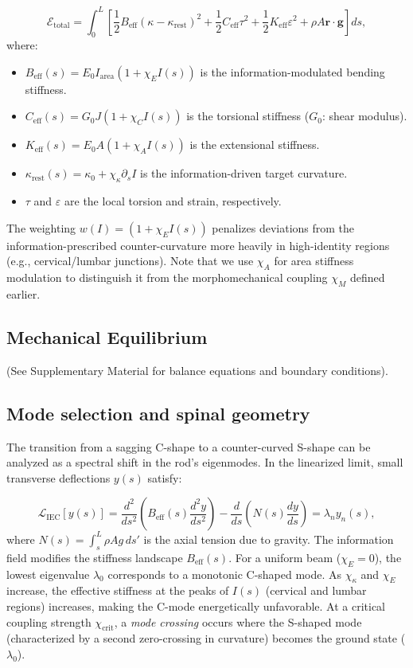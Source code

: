\documentclass[11pt,a4paper]{article}
\begin{document}
\begin{equation}
\mathcal{E}_{\mathrm{total}} = \int_0^L \left[ \frac{1}{2} B_{\mathrm{eff}}(\kappa - \kappa_{\mathrm{rest}})^2 + \frac{1}{2} C_{\mathrm{eff}} \tau^2 + \frac{1}{2} K_{\mathrm{eff}} \varepsilon^2 + \rho A \mathbf{r} \cdot \mathbf{g} \right] ds,
\label{eq:iec_energy}
\end{equation}
where:
\begin{itemize}
    \item $B_{\mathrm{eff}}(s) = E_0 I_{\mathrm{area}} (1 + \chi_E I(s))$ is the information-modulated bending stiffness.
    \item $C_{\mathrm{eff}}(s) = G_0 J (1 + \chi_C I(s))$ is the torsional stiffness ($G_0$: shear modulus).
    \item $K_{\mathrm{eff}}(s) = E_0 A (1 + \chi_A I(s))$ is the extensional stiffness.
    \item $\kappa_{\mathrm{rest}}(s) = \kappa_0 + \chi_\kappa \partial_s I$ is the information-driven target curvature.
    \item $\tau$ and $\varepsilon$ are the local torsion and strain, respectively.
\end{itemize}
The weighting $w(I) = (1 + \chi_E I(s))$ penalizes deviations from the information-prescribed counter-curvature more heavily in high-identity regions (e.g., cervical/lumbar junctions). Note that we use $\chi_A$ for area stiffness modulation to distinguish it from the morphomechanical coupling $\chi_M$ defined earlier.

\subsection{Mechanical Equilibrium}
(See Supplementary Material for balance equations and boundary conditions).

\subsection{Mode selection and spinal geometry}

The transition from a sagging C-shape to a counter-curved S-shape can be analyzed as a spectral shift in the rod's eigenmodes. In the linearized limit, small transverse deflections $y(s)$ satisfy:

\begin{equation}
\mathcal{L}_{\mathrm{IEC}}[y(s)] = \frac{d^2}{ds^2} \left( B_{\mathrm{eff}}(s) \frac{d^2 y}{ds^2} \right) - \frac{d}{ds} \left( N(s) \frac{dy}{ds} \right) = \lambda_n y_n(s),
\label{eq:mode_selection}
\end{equation}
where $N(s) = \int_s^L \rho A g \, ds'$ is the axial tension due to gravity. The information field modifies the stiffness landscape $B_{\mathrm{eff}}(s)$. For a uniform beam ($\chi_E = 0$), the lowest eigenvalue $\lambda_0$ corresponds to a monotonic C-shaped mode. As $\chi_\kappa$ and $\chi_E$ increase, the effective stiffness at the peaks of $I(s)$ (cervical and lumbar regions) increases, making the C-mode energetically unfavorable. At a critical coupling strength $\chi_{\mathrm{crit}}$, a \emph{mode crossing} occurs where the S-shaped mode (characterized by a second zero-crossing in curvature) becomes the ground state ($\lambda_0$).
\end{document}
